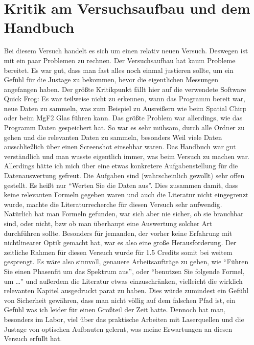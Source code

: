 \documentclass[twoside,        %
               BCOR12mm,       %
               english,ngerman, %
               fleqn,headsepline=false,footsepline=false
              ]{Vorlage/MFPREPORT}
\begin{document}
\section{Kritik am Versuchsaufbau und dem Handbuch}
Bei diesem Versuch handelt es sich um einen relativ neuen Versuch. Deswegen ist
mit ein paar Problemen zu rechnen. Der Versuchsaufbau hat kaum Probleme
bereitet. Es war gut, dass man fast alles noch einmal justieren sollte, um ein
Gefühl für die Justage zu bekommen, bevor die eigentlichen Messungen angefangen
haben. Der größte Kritikpunkt fällt hier auf die verwendete Software Quick
Frog: Es war teilweise nicht zu erkennen, wann das Programm bereit war, neue
Daten zu sammeln, was zum Beispiel zu Ausreißern wie beim Spatial Chirp oder
beim MgF2 Glas führen kann. Das größte Problem war allerdings, wie das Programm
Daten gespeichert hat. So war es sehr mühsam, durch alle Ordner zu gehen und
die relevanten Daten zu sammeln, besonders Weil viele Daten ausschließlich über
einen Screenshot einsehbar waren.
Das Handbuch war gut verständlich und man wusste eigentlich immer, was beim
Versuch zu machen war. Allerdings hätte ich mich über eine etwas konkretere
Aufgabenstellung für die Datenauswertung gefreut. Die Aufgaben sind
(wahrscheinlich gewollt) sehr offen gestellt. Es heißt nur ``Werten Sie die
Daten aus''. Dies zusammen damit, dass keine relevanten Formeln gegeben waren
und auch die Literatur nicht eingegrenzt wurde, machte die Literaturrecherche
für diesen Versuch sehr aufwendig. Natürlich hat man Formeln gefunden, war sich
aber nie sicher, ob sie brauchbar sind, oder nicht, bzw ob man überhaupt eine
Auswertung solcher Art durchführen sollte. Besonders für jemanden, der vorher
keine Erfahrung mit nichtlinearer Optik gemacht hat, war es also eine große
Herausforderung. Der zeitliche Rahmen für diesen Versuch wurde für 1.5 Credits
somit bei weitem gesprengt. Es wäre also sinnvoll, genauere Arbeitsaufträge zu
geben, wie ``Führen Sie einen Phasenfit um das Spektrum aus'', oder ``benutzen
Sie folgende Formel, um \ldots'' und außerdem die Literatur etwas
einzuschränken, vielleicht die wirklich relevanten Kapitel ausgedruckt parat zu
haben. Dies würde zumindest ein Gefühl von
Sicherheit gewähren, dass man nicht völlig auf dem falschen Pfad ist, ein
Gefühl was ich leider für einen Großteil der Zeit hatte.
Dennoch hat man, besonders im Labor, viel über das praktische Arbeiten mit
Laserquellen und die Justage von optischen Aufbauten gelernt, was meine
Erwartungen an diesen Versuch erfüllt hat.




\end{document}
